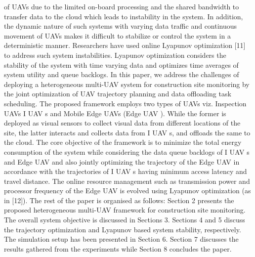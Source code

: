 \documentclass{article}
\begin{document}
\begin{multicols}{2}
of UAVs due to the limited on-board processing and
the shared bandwidth to transfer data to the cloud which
leads to instability in the system. In addition, the dynamic
nature of such systems with varying data traffic
and continuous movement of UAVs makes it difficult to
stabilize or control the system in a deterministic manner.
Researchers have used online Lyapunov optimization
[11] to address such system instabilities. Lyapunov optimization
considers the stability of the system with time
varying data and optimizes time averages of system utility
and queue backlogs.
In this paper, we address the challenges of deploying
a heterogeneous multi-UAV system for construction site
monitoring by the joint optimization of UAV trajectory
planning and data offloading task scheduling. The proposed
framework employs two types of UAVs viz. Inspection
UAVs I UAV s and Mobile Edge UAVs (Edge UAV ).
While the former is deployed as visual sensors to collect
visual data from different locations of the site, the latter
interacts and collects data from I UAV s, and offloads the
same to the cloud. The core objective of the framework
is to minimize the total energy consumption of the system
while considering the data queue backlogs of I UAV s
and Edge UAV and also jointly optimizing the trajectory
of the Edge UAV in accordance with the trajectories of
I UAV s having minimum access latency and travel distance.
The online resource management such as transmission
power and processor frequency of the Edge UAV is
evolved using Lyapunov optimization (as in [12]).
The rest of the paper is organised as follows: Section
2 presents the proposed heterogeneous multi-UAV framework
for construction site monitoring. The overall system
objective is discussed in Sections 3. Sections 4 and 5 discuss
the trajectory optimization and Lyapunov based system
stability, respectively. The simulation setup has been
presented in Section 6. Section 7 discusses the results
gathered from the experiments while Section 8 concludes
the paper.


\end{multicols}
\end{document}
